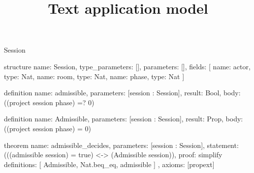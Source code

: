\begin{lexlean}{Session}
\title{Text application model}
\begin{semanticmodule}
structure{
  name: Session,
  type_parameters: [],
  parameters: [],
  fields: [
    {name: actor, type: Nat},
    {name: room, type: Nat},
    {name: phase, type: Nat}
  ]
}

definition{
  name: admissible,
  parameters: [session : Session],
  result: Bool,
  body: ((project session phase) =? 0)
}

definition{
  name: Admissible,
  parameters: [session : Session],
  result: Prop,
  body: ((project session phase) = 0)
}

theorem{
  name: admissible_decides,
  parameters: [session : Session],
  statement: (((admissible session) = true) <-> (Admissible session)),
  proof: simplify{
    definitions: [
      Admissible,
      Nat.beq_eq,
      admissible
    ]
  },
  axioms: [propext]
}
\end{semanticmodule}
\end{lexlean}
